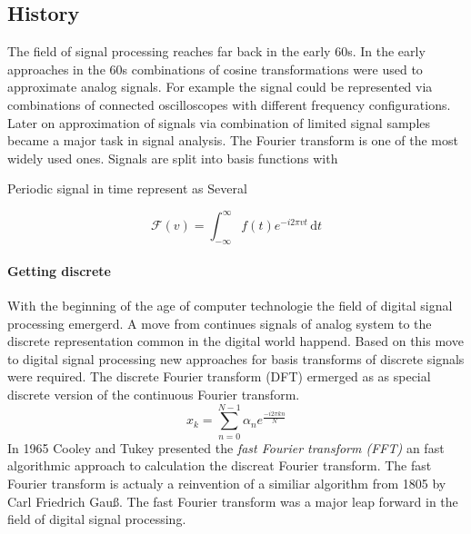

\subsection{History}
\label{sec:history}
The field of signal processing reaches far back in the early 60s.
\cite{Rubinstein2010}
In the early approaches in the 60s combinations of cosine 
transformations were used to approximate analog signals. For example the signal
could be represented via combinations of connected oscilloscopes with different
frequency configurations.  Later on approximation of signals via combination of
limited signal samples became a major task in signal analysis.  The Fourier
transform is one of the most widely used ones. Signals are split into basis
functions with 

Periodic signal in time represent as 
Several 

\begin{equation*}
\mathcal{F}\left(v\right) = \int_{-\infty}^{\infty} \! f(t)e^{-i2\pi vt} \,
\mathrm{d}t
\end{equation*}

\paragraph{Getting discrete}
With the beginning of the age of computer technologie the field of digital
signal processing emergerd. A move from continues signals of analog system to
the discrete representation common in the digital world happend. Based on this
move to digital signal processing new approaches for basis transforms of
discrete signals were required. The discrete Fourier transform (DFT) ermerged as
as special discrete version of the continuous Fourier transform.
\begin{equation*}
 x_k = \sum_{n=0}^{N-1}\alpha_ne^{\frac{-i2\pi kn}{N}}
\end{equation*}
In 1965 Cooley and Tukey presented\cite{Cooley1965} the \emph{fast Fourier
transform (FFT)} an fast algorithmic approach to calculation the discreat
Fourier transform. The fast Fourier transform is actualy a reinvention of a
similiar algorithm from 1805 by Carl Friedrich Gauß. The fast Fourier transform
was a major leap forward in the field of digital signal processing.

